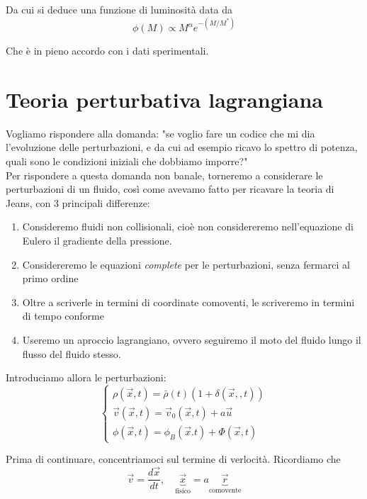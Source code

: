 \documentclass{report}
\begin{document}
Da cui si deduce una funzione di luminosità data da 
\begin{equation}
    \phi(M) \propto M^{\alpha}e^{-(M/M^*)}
\end{equation}

Che è in pieno accordo con i dati sperimentali. 


\section{Teoria perturbativa lagrangiana}

Vogliamo rispondere alla domanda: "se voglio fare un codice che mi dia l'evoluzione delle perturbazioni, e da cui ad esempio ricavo lo spettro di potenza, quali sono le condizioni iniziali che dobbiamo imporre?"\\

Per rispondere a questa domanda non banale, torneremo a considerare le perturbazioni di un fluido, così come avevamo fatto per ricavare la teoria di Jeans, con 3 principali differenze: \\

\begin{enumerate}
    \item Consideremo fluidi non collisionali, cioè non considereremo nell'equazione di Eulero il gradiente della pressione. \\
    \item Considereremo le equazioni \emph{complete} per le perturbazioni, senza fermarci al primo ordine 
    \item Oltre a scriverle in termini di coordinate comoventi, le scriveremo in termini di tempo conforme 
    \item Useremo un aproccio lagrangiano, ovvero seguiremo il moto del fluido lungo il flusso del fluido stesso. 
\end{enumerate}

Introduciamo allora le perturbazioni: \\

\[\begin{cases}
    \rho(\vec{x}, t) = \bar{\rho}(t)(1 + \delta(\vec{x},, t)) \\ \vec{v}(\vec{x}, t) = \vec{v}_0(\vec{x}, t) + a\vec{u} \\ \phi(\vec{x}, t) = \phi_B(\vec{x}. t) + \Phi (\vec{x}, t)
\end{cases}\]

Prima di continuare, concentriamoci sul termine di verlocità. Ricordiamo che 
\begin{equation}
    \vec{v} = \frac{d\vec{x}}{dt}, \quad \underbrace{\vec{x}}_{\text{fisico}} = a\underbrace{\vec{r}}_{\text{comovente}}
\end{equation}
\end{document}
